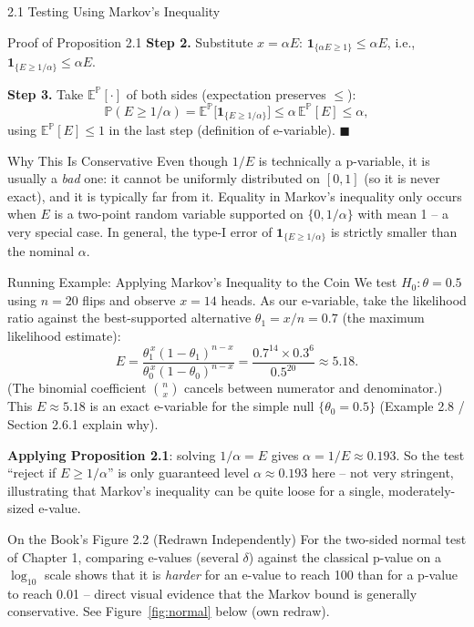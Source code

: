 \documentclass[aspectratio=169,10pt]{beamer}
\newcommand{\PP}{\mathbb{P}}
\newcommand{\EE}{\mathbb{E}}
\newcommand{\ind}[1]{\mathbf{1}_{\{#1\}}}
\begin{document}
\begin{frame}[allowframebreaks]{2.1 Testing Using Markov's Inequality}
\begin{block}{Proof of Proposition 2.1}
    \medskip
    \textbf{Step 2.} Substitute $x = \alpha E$:
    $\ind{\alpha E \ge 1} \le \alpha E$, i.e., $\ind{E \ge 1/\alpha} \le \alpha E$.

    \medskip
    \textbf{Step 3.} Take $\EE^\PP[\cdot]$ of both sides (expectation preserves
    $\le$):
    \[
      \PP(E \ge 1/\alpha) = \EE^\PP\big[\ind{E\ge 1/\alpha}\big]
      \le \alpha\, \EE^\PP[E] \le \alpha,
    \]
    using $\EE^\PP[E] \le 1$ in the last step (definition of e-variable). $\blacksquare$
  \end{block}

  \begin{alertblock}{Why This Is Conservative}
    Even though $1/E$ is technically a p-variable, it is usually a
    \emph{bad} one: it cannot be uniformly distributed on $[0,1]$ (so it is
    never exact), and it is typically far from it. Equality in Markov's
    inequality only occurs when $E$ is a two-point random variable
    supported on $\{0, 1/\alpha\}$ with mean 1 -- a very special case.
    In general, the type-I error of $\ind{E\ge1/\alpha}$ is strictly
    smaller than the nominal $\alpha$.
  \end{alertblock}

  \framebreak

  \begin{exampleblock}{Running Example: Applying Markov's Inequality to the Coin}
    We test $H_0:\theta=0.5$ using $n=20$ flips and observe $x=14$ heads.
    As our e-variable, take the likelihood ratio against the
    best-supported alternative $\theta_1 = x/n = 0.7$ (the maximum
    likelihood estimate):
    \[
      E = \frac{\theta_1^{\,x}(1-\theta_1)^{n-x}}{\theta_0^{\,x}(1-\theta_0)^{n-x}}
        = \frac{0.7^{14}\times 0.3^{6}}{0.5^{20}} \approx 5.18.
    \]
    (The binomial coefficient $\binom{n}{x}$ cancels between numerator and
    denominator.) This $E\approx 5.18$ is an exact e-variable for the simple
    null $\{\theta_0=0.5\}$ (Example 2.8 / Section 2.6.1 explain why).

    \medskip
    \textbf{Applying Proposition 2.1}: solving $1/\alpha = E$ gives
    $\alpha = 1/E \approx 0.193$. So the test ``reject if $E \ge 1/\alpha$''
    is only guaranteed level $\alpha\approx0.193$ here -- not very
    stringent, illustrating that Markov's inequality can be quite loose for
    a single, moderately-sized e-value.
  \end{exampleblock}

  \begin{block}{On the Book's Figure 2.2 (Redrawn Independently)}
    For the two-sided normal test of Chapter 1, comparing e-values (several
    $\delta$) against the classical p-value on a $\log_{10}$ scale shows that
    it is \emph{harder} for an e-value to reach 100 than for a p-value to
    reach 0.01 -- direct visual evidence that the Markov bound is generally
    conservative. See Figure~\ref{fig:normal} below (own redraw).
  \end{block}


\end{frame}
\end{document}
